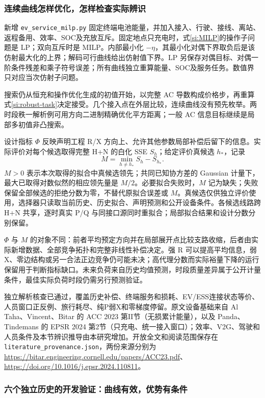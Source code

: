 \documentclass[UTF8,fontset=fandol,11pt,a4paper]{ctexart}
\begin{document}
\subsubsection{连续曲线怎样优化，怎样检查实际辨识}

新增 \texttt{ev\_service\_milp.py} 固定终端电池能量，并加入接入、行驶、接线、离站、返程备用、效率、SOC及充放互斥。固定地点只充电时，式\eqref{si:MILP}的操作子问题是 LP；双向互斥时是 MILP。内部最小化 $-\eta$，其最小化对偶下界取负后是该仿射最大化的上界；解码可行曲线给出仿射值下界。LP 另保存对偶目标、对偶一阶条件残差和乘子符号误差；所有曲线独立重算能量、SOC及服务任务。数值界只对应当次仿射子问题。

搜索仍从恒充和操作优化生成的初值开始，以完整 AC 导数构成价格步，再重算式\eqref{si:robust-task}决定接受。几个接入点在外层比较，连续曲线没有预先枚举。两时段秩一解析例可用方向二进制精确优化平方距离；一般 AC 信息目标继续是局部多初值非凸搜索。

设计指标 $\Phi$ 反映声明工程 R/X 方向上、允许其他参数局部补偿后留下的信息。实际评价对每个候选取得完整 H+N 的白化 SSE $S_h$；给定评价真候选 $h_*$，记录
\begin{equation}
 \boxed{M=\min_{h\ne h_*}S_h-S_{h_*}.}
 \label{evf:actual-margin}
\end{equation}
$M>0$ 表示本次取得的拟合中真候选领先；共同已知协方差的 Gaussian 计量下，最大已取得对数似然的相应领先量是 $M/2$。必要拟合失败时，$M$ 记为缺失；失败保留全部候选的拒绝分数为零，不替代原拟合误差或 $M$。真候选仅供独立评价使用，选择器只读取当前历史、历史拟合、声明预测和公开设备条件。各候选线路跨 H+N 共享，逐时真实 P/Q 与同接口源同时重拟合；局部拟合结果和设计分数分别保留。

$\Phi$ 与 $M$ 的对象不同：前者平均预定方向并在局部展开点比较支路收缩，后者由实际新增数据、全部竞争拓扑和完整非线性补偿决定。强 R 可以提高平均信息，弱 X、零边结构或另一合法正边竞争仍可能未决；高代理分数而实际裕量下降的运行保留用于判断指标缺口。未来负荷来自历史均值预测，时段质量差异属于公开计量条件，最佳实际负荷时段仍需另行预测验证。

独立解析核查已通过，覆盖历史补偿、终端服务和损耗、EV/ESS连接状态等价、人员窗口正反例、旅行耗尽、纯P弱X和零梯度停留。原文设备基础来自 Al Taha、Vincent、Bitar 的 ACC 2023 第II节（无损累计能量），以及 Panda、Tindemans 的 EPSR 2024 第2节（只充电、统一接入窗口）；效率、V2G、驾驶和人员条件及本节辨识推导由本研究增加。开放全文和阅读范围保存在 \texttt{literature\_provenance.json}，两份来源分别为
\url{https://bitar.engineering.cornell.edu/papers/ACC23.pdf}、
\url{https://doi.org/10.1016/j.epsr.2024.110811}。
\subsubsection{六个独立历史的开发验证：曲线有效，优势有条件}
\end{document}
